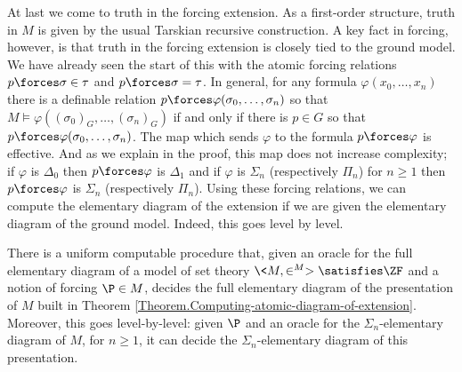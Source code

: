 \documentclass{amsart}
\begin{document}
At last we come to truth in the forcing extension. As a first-order structure, truth in $M$ is given by the usual Tarskian recursive construction. A key fact in forcing, however, is that truth in the forcing extension is closely tied to the ground model. We have already seen the start of this with the atomic forcing relations $p \forces \sigma \in \tau$ and $p \forces \sigma = \tau$. In general, for any formula $\varphi(x_0,\ldots,x_n)$ there is a definable relation $p \forces \varphi(\sigma_0,\ldots,\sigma_n)$ so that $M \models \varphi((\sigma_0)_G,\ldots,(\sigma_n)_G)$ if and only if there is $p \in G$ so that $p \forces \varphi(\sigma_0,\ldots,\sigma_n)$. The map which sends $\varphi$ to the formula $p \forces \varphi$ is effective. And as we explain in the proof, this map does not increase complexity; if $\varphi$ is $\Delta_0$ then $p \forces \varphi$ is $\Delta_1$ and if $\varphi$ is $\Sigma_n$ (respectively $\Pi_n$) for $n \ge 1$ then $p \forces \varphi$ is $\Sigma_n$ (respectively $\Pi_n$).
Using these forcing relations, we can compute the elementary diagram of the extension if we are given the elementary diagram of the ground model. Indeed, this goes level by level.
\begin{theorem}\label{Theorem.Computing-diagram-of-extension}
There is a uniform computable procedure that, given an oracle for the full elementary diagram of a model of set theory $\<M,\in^M>\satisfies\ZF$ and a notion of forcing $\P\in M$, decides the full elementary diagram of the presentation of $M$ built in Theorem \ref{Theorem.Computing-atomic-diagram-of-extension}.
Moreover, this goes level-by-level: given $\P$ and an oracle for the $\Sigma_n$-elementary diagram of $M$, for $n \ge 1$, it can decide the $\Sigma_n$-elementary diagram of this presentation.
\end{theorem}
\end{document}
